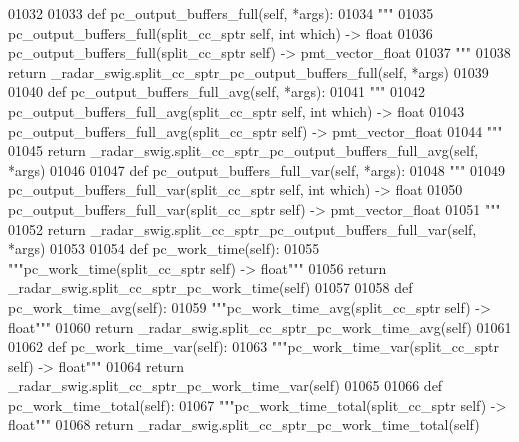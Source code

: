 \begin{DoxyCode}
{{{{{01032 
01033     \textcolor{keyword}{def }pc_output_buffers_full(self, *args):
01034         \textcolor{stringliteral}{"""}
01035 \textcolor{stringliteral}{        pc\_output\_buffers\_full(split\_cc\_sptr self, int which) -> float}
01036 \textcolor{stringliteral}{        pc\_output\_buffers\_full(split\_cc\_sptr self) -> pmt\_vector\_float}
01037 \textcolor{stringliteral}{        """}
01038         \textcolor{keywordflow}{return} \_radar\_swig.split\_cc\_sptr\_pc\_output\_buffers\_full(self, *args)
01039 
01040     \textcolor{keyword}{def }pc_output_buffers_full_avg(self, *args):
01041         \textcolor{stringliteral}{"""}
01042 \textcolor{stringliteral}{        pc\_output\_buffers\_full\_avg(split\_cc\_sptr self, int which) -> float}
01043 \textcolor{stringliteral}{        pc\_output\_buffers\_full\_avg(split\_cc\_sptr self) -> pmt\_vector\_float}
01044 \textcolor{stringliteral}{        """}
01045         \textcolor{keywordflow}{return} \_radar\_swig.split\_cc\_sptr\_pc\_output\_buffers\_full\_avg(self, *args)
01046 
01047     \textcolor{keyword}{def }pc_output_buffers_full_var(self, *args):
01048         \textcolor{stringliteral}{"""}
01049 \textcolor{stringliteral}{        pc\_output\_buffers\_full\_var(split\_cc\_sptr self, int which) -> float}
01050 \textcolor{stringliteral}{        pc\_output\_buffers\_full\_var(split\_cc\_sptr self) -> pmt\_vector\_float}
01051 \textcolor{stringliteral}{        """}
01052         \textcolor{keywordflow}{return} \_radar\_swig.split\_cc\_sptr\_pc\_output\_buffers\_full\_var(self, *args)
01053 
01054     \textcolor{keyword}{def }pc_work_time(self):
01055         \textcolor{stringliteral}{"""pc\_work\_time(split\_cc\_sptr self) -> float"""}
01056         \textcolor{keywordflow}{return} \_radar\_swig.split\_cc\_sptr\_pc\_work\_time(self)
01057 
01058     \textcolor{keyword}{def }pc_work_time_avg(self):
01059         \textcolor{stringliteral}{"""pc\_work\_time\_avg(split\_cc\_sptr self) -> float"""}
01060         \textcolor{keywordflow}{return} \_radar\_swig.split\_cc\_sptr\_pc\_work\_time\_avg(self)
01061 
01062     \textcolor{keyword}{def }pc_work_time_var(self):
01063         \textcolor{stringliteral}{"""pc\_work\_time\_var(split\_cc\_sptr self) -> float"""}
01064         \textcolor{keywordflow}{return} \_radar\_swig.split\_cc\_sptr\_pc\_work\_time\_var(self)
01065 
01066     \textcolor{keyword}{def }pc_work_time_total(self):
01067         \textcolor{stringliteral}{"""pc\_work\_time\_total(split\_cc\_sptr self) -> float"""}
01068         \textcolor{keywordflow}{return} \_radar\_swig.split\_cc\_sptr\_pc\_work\_time\_total(self)
}}}}}
\end{DoxyCode}

